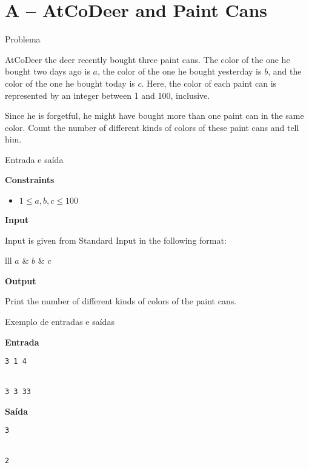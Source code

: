 \section{A -- AtCoDeer and Paint Cans}

\begin{frame}[fragile]{Problema}

AtCoDeer the deer recently bought three paint cans. The color of the one he bought two days ago is 
$a$, the color of the one he bought yesterday is $b$, and the color of the one he bought today is 
$c$. Here, the color of each paint can is represented by an integer between 1 and 100, inclusive.

Since he is forgetful, he might have bought more than one paint can in the same color. Count the
number of different kinds of colors of these paint cans and tell him.

\end{frame}

\begin{frame}[fragile]{Entrada e saída}

\textbf{Constraints}

\begin{itemize}
    \item $1\leq a, b, c\leq 100$
\end{itemize}

\vspace{0.1in}

\textbf{Input}

Input is given from Standard Input in the following format:
\begin{atcoderio}{lll}
$a$ & $b$ & $c$ \\
\end{atcoderio}

\textbf{Output}

Print the number of different kinds of colors of the paint cans.

\end{frame}

\begin{frame}[fragile]{Exemplo de entradas e saídas}

\begin{minipage}[t]{0.45\textwidth}
\textbf{Entrada}
\begin{verbatim}
3 1 4


3 3 33
\end{verbatim}
\end{minipage}
\begin{minipage}[t]{0.5\textwidth}
\textbf{Saída}
\begin{verbatim}
3


2
\end{verbatim}
\end{minipage}
\end{frame}

